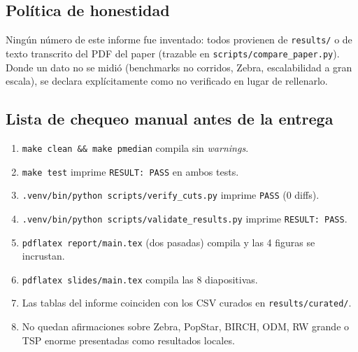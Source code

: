 \subsection{Política de honestidad}
Ningún número de este informe fue inventado: todos provienen de \texttt{results/} o de texto
transcrito del PDF del paper (trazable en \texttt{scripts/compare\_paper.py}). Donde un dato no se
midió (benchmarks no corridos, Zebra, escalabilidad a gran escala), se declara explícitamente como
no verificado en lugar de rellenarlo.

\subsection*{Lista de chequeo manual antes de la entrega}
\begin{enumerate}[noitemsep]
  \item \texttt{make clean \&\& make pmedian} compila sin \emph{warnings}.
  \item \texttt{make test} imprime \texttt{RESULT: PASS} en ambos tests.
  \item \texttt{.venv/bin/python scripts/verify\_cuts.py} imprime \texttt{PASS} (0 diffs).
  \item \texttt{.venv/bin/python scripts/validate\_results.py} imprime \texttt{RESULT: PASS}.
  \item \texttt{pdflatex report/main.tex} (dos pasadas) compila y las 4 figuras se incrustan.
  \item \texttt{pdflatex slides/main.tex} compila las 8 diapositivas.
  \item Las tablas del informe coinciden con los CSV curados en \texttt{results/curated/}.
  \item No quedan afirmaciones sobre Zebra, PopStar, BIRCH, ODM, RW grande o TSP enorme presentadas
        como resultados locales.
\end{enumerate}
